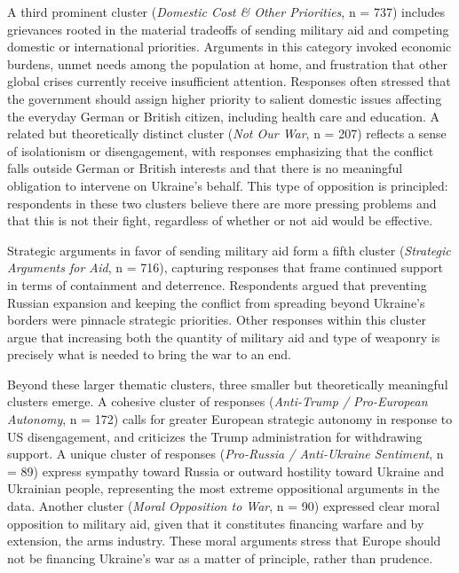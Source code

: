 A third prominent cluster (\textit{Domestic Cost \& Other Priorities}, n = 737) includes grievances rooted in the material tradeoffs of sending military aid and competing domestic or international priorities. Arguments in this category invoked economic burdens, unmet needs among the population at home, and frustration that other global crises currently receive insufficient attention. Responses often stressed that the government should assign higher priority to salient domestic issues affecting the everyday German or British citizen, including health care and education. A related but theoretically distinct cluster (\textit{Not Our War}, n = 207) reflects a sense of isolationism or disengagement, with responses emphasizing that the conflict falls outside German or British interests and that there is no meaningful obligation to intervene on Ukraine's behalf. This type of opposition is principled: respondents in these two clusters believe there are more pressing problems and that this is not their fight, regardless of whether or not aid would be effective. 

Strategic arguments in favor of sending military aid form a fifth cluster (\textit{Strategic Arguments for Aid}, n = 716), capturing responses that frame continued support in terms of containment and deterrence. Respondents argued that preventing Russian expansion and keeping the conflict from spreading beyond Ukraine's borders were pinnacle strategic priorities. Other responses within this cluster argue that increasing both the quantity of military aid and type of weaponry is precisely what is needed to bring the war to an end. 

Beyond these larger thematic clusters, three smaller but theoretically meaningful clusters emerge. A cohesive cluster of responses (\textit{Anti-Trump / Pro-European Autonomy}, n = 172) calls for greater European strategic autonomy in response to US disengagement, and criticizes the Trump administration for withdrawing support. A unique cluster of responses (\textit{Pro-Russia / Anti-Ukraine Sentiment}, n = 89) express sympathy toward Russia or outward hostility toward Ukraine and Ukrainian people, representing the most extreme oppositional arguments in the data. Another cluster (\textit{Moral Opposition to War}, n = 90) expressed clear moral opposition to military aid, given that it constitutes financing warfare and by extension, the arms industry. These moral arguments stress that Europe should not be financing Ukraine's war as a matter of principle, rather than prudence.

